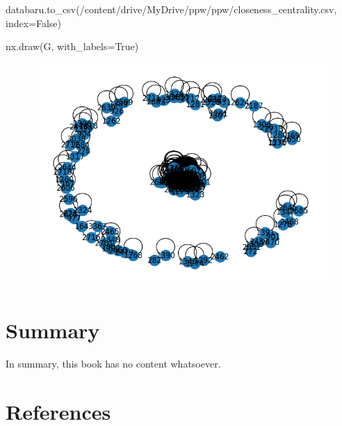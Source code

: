 \documentclass[
  letterpaper,
]{krantz}
\makeatletter
\newenvironment{Shaded}{\begin{snugshade}}{\end{snugshade}}
\newcommand{\NormalTok}[1]{\textcolor[rgb]{0.00,0.23,0.31}{#1}}
\newcommand{\OperatorTok}[1]{\textcolor[rgb]{0.37,0.37,0.37}{#1}}
\newcommand{\StringTok}[1]{\textcolor[rgb]{0.13,0.47,0.30}{#1}}
\newcommand{\VariableTok}[1]{\textcolor[rgb]{0.07,0.07,0.07}{#1}}
\newlength{\cslhangindent}
\newlength{\cslentryspacingunit} %
\newenvironment{CSLReferences}[2] %
 {%
  \setlength{\parindent}{0pt}
  \ifodd #1
  \let\oldpar\par
  \def\par{\hangindent=\cslhangindent\oldpar}
  \fi
  \setlength{\parskip}{#2\cslentryspacingunit}
 }%
 {}
\newenvironment{kframe}{%
\medskip{}
\setlength{\fboxsep}{.8em}
 \def\at@end@of@kframe{}%
 \ifinner\ifhmode%
  \def\at@end@of@kframe{\end{minipage}}%
  \begin{minipage}{\columnwidth}%
 \fi\fi%
 \def\FrameCommand##1{\hskip\@totalleftmargin \hskip-\fboxsep
 \colorbox{shadecolor}{##1}\hskip-\fboxsep
     \hskip-\linewidth \hskip-\@totalleftmargin \hskip\columnwidth}%
 \MakeFramed {\advance\hsize-\width
   \@totalleftmargin\z@ \linewidth\hsize
   \@setminipage}}%
 {\par\unskip\endMakeFramed%
 \at@end@of@kframe}
\renewenvironment{Shaded}{\begin{kframe}}{\end{kframe}}
\makeatother
\begin{document}
\begin{Shaded}
\begin{Highlighting}[]
\NormalTok{databaru.to\_csv(}\StringTok{\textquotesingle{}/content/drive/MyDrive/ppw/ppw/closeness\_centrality.csv\textquotesingle{}}\NormalTok{, index}\OperatorTok{=}\VariableTok{False}\NormalTok{)}
\end{Highlighting}
\end{Shaded}

\begin{Shaded}
\begin{Highlighting}[]
\NormalTok{nx.draw(G, with\_labels}\OperatorTok{=}\VariableTok{True}\NormalTok{)}
\end{Highlighting}
\end{Shaded}

\begin{figure}[H]

{\centering \includegraphics{Test_files/figure-pdf/cell-13-output-1.png}

}

\end{figure}


\hypertarget{summary}{%
\chapter{Summary}\label{summary}}

In summary, this book has no content whatsoever.


\hypertarget{references}{%
\chapter*{References}\label{references}}


\hypertarget{refs}{}
\begin{CSLReferences}{0}{0}
\end{CSLReferences}



\backmatter
\printindex
\end{document}
